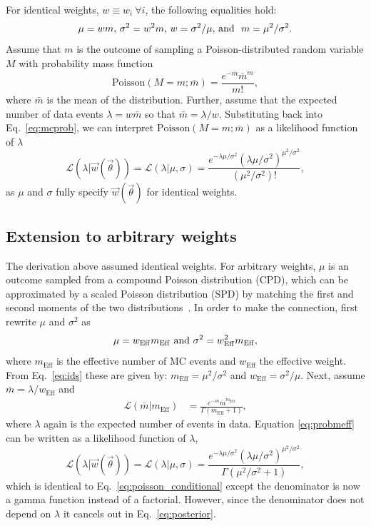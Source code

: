 \documentclass[a4paper, 11pt]{article}
\newcommand{\like}{\mathcal{L}}
\newcommand{\vectheta}{\vec{\theta}}
\newcommand{\vecw}{\vec{w}}
\newcommand{\meff}{m_\mathrm{Eff}}
\newcommand{\weff}{w_\mathrm{Eff}}
\begin{document}
For identical weights, $w \equiv w_i~\forall i$, the following equalities hold:
\begin{equation}\label{eq:ids}
\mu=wm \textmd{,}~ \sigma^2=w^2 m \textmd{,}~ w=\sigma^2/\mu \textmd{, and }~ m = \mu^2/\sigma^2.
\end{equation} 
Assume that $m$ is the outcome of sampling a Poisson-distributed random variable $M$ with probability mass function
\begin{equation}\label{eq:mcprob}
\mathrm{Poisson}(M=m;\bar m) = \frac{e^{-\bar m} {\bar m}^m}{m!},
\end{equation}
where $\bar m$ is the mean of the distribution. Further, assume that the expected number of data events $\lambda=w \bar m$ so that $\bar m = \lambda/w$. Substituting back into Eq.~\eqref{eq:mcprob}, we can interpret $\mathrm{Poisson}(M=m;\bar m)$ as a likelihood function of $\lambda$
\begin{equation}
\like(\lambda|\vecw(\vectheta))=\like(\lambda|\mu, \sigma)=\frac{e^{-\lambda\mu/\sigma^2}\left(\lambda\mu/\sigma^2\right)^{\mu^2/\sigma^2}}{(\mu^2/\sigma^2)!},
\label{eq:poisson_conditional}
\end{equation}
as $\mu$ and $\sigma$ fully specify $\vecw(\vectheta)$ for identical weights. 

\subsection{Extension to arbitrary weights\label{sec:extending}}
The derivation above assumed identical weights. For arbitrary weights, $\mu$ is an outcome sampled from a compound Poisson distribution (CPD), which can be approximated by a scaled Poisson distribution (SPD) by matching the first and second moments of the two distributions~\cite{Bohm:2013gla}. In order to make the connection, first rewrite $\mu$ and $\sigma^2$ as
\begin{equation}\label{eq:effparameters}
\mu= \weff \meff~\textmd{and}~\sigma^2 = \weff^2 \meff,
\end{equation}
where $\meff$ is the effective number of MC events and $\weff$ the effective weight. From Eq.~\eqref{eq:ids} these are given by: $\meff = \mu^2/\sigma^2$ and $\weff=\sigma^2/\mu$. Next, assume $\bar m = \lambda/\weff$ and
\begin{align}
\label{eq:probmeff}
\like(\bar m|\meff)&= \frac{e^{-\bar m}{\bar m}^{\meff}}{\Gamma(\meff+1)},
\end{align}
where $\lambda$ again is the expected number of events in data. Equation \eqref{eq:probmeff} can be written as a likelihood function of $\lambda$,
\begin{equation}
\like(\lambda|\vecw(\vectheta))=\like(\lambda|\mu, \sigma)=\frac{e^{-\lambda\mu/\sigma^2}\left(\lambda\mu/\sigma^2\right)^{\mu^2/\sigma^2}}{\Gamma(\mu^2/\sigma^2+1)},
\label{eq:poisson_conditional_arb}
\end{equation}
which is identical to Eq.~\eqref{eq:poisson_conditional} except the denominator is now a gamma function instead of a factorial. However, since the denominator does not depend on $\lambda$ it cancels out in Eq.~\eqref{eq:posterior}.
\end{document}
